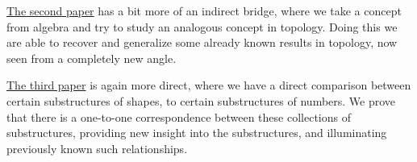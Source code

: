 {\hyperref[ch:3]{The second paper}} has a bit more of an indirect bridge, where we take a concept from algebra and try to study an analogous concept in topology. Doing this we are able to recover and generalize some already known results in topology, now seen from a completely new angle. 

{\hyperref[ch:4]{The third paper}} is again more direct, where we have a direct comparison between certain substructures of shapes, to certain substructures of numbers. We prove that there is a one-to-one correspondence between these collections of substructures, providing new insight into the substructures, and illuminating previously known such relationships. 